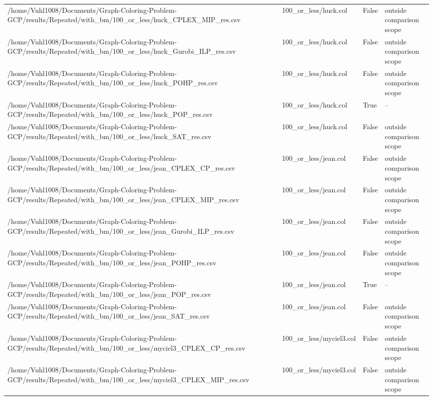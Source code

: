 \begin{table}[htbp]
\begin{tabular}{llll}
/home/Vuhl1008/Documents/Graph-Coloring-Problem-GCP/results/Repeated/with\_bm/100\_or\_less/huck\_CPLEX\_MIP\_res.csv & 100\_or\_less/huck.col & False & outside comparison scope \\
/home/Vuhl1008/Documents/Graph-Coloring-Problem-GCP/results/Repeated/with\_bm/100\_or\_less/huck\_Gurobi\_ILP\_res.csv & 100\_or\_less/huck.col & False & outside comparison scope \\
/home/Vuhl1008/Documents/Graph-Coloring-Problem-GCP/results/Repeated/with\_bm/100\_or\_less/huck\_POHP\_res.csv & 100\_or\_less/huck.col & False & outside comparison scope \\
/home/Vuhl1008/Documents/Graph-Coloring-Problem-GCP/results/Repeated/with\_bm/100\_or\_less/huck\_POP\_res.csv & 100\_or\_less/huck.col & True & -- \\
/home/Vuhl1008/Documents/Graph-Coloring-Problem-GCP/results/Repeated/with\_bm/100\_or\_less/huck\_SAT\_res.csv & 100\_or\_less/huck.col & False & outside comparison scope \\
/home/Vuhl1008/Documents/Graph-Coloring-Problem-GCP/results/Repeated/with\_bm/100\_or\_less/jean\_CPLEX\_CP\_res.csv & 100\_or\_less/jean.col & False & outside comparison scope \\
/home/Vuhl1008/Documents/Graph-Coloring-Problem-GCP/results/Repeated/with\_bm/100\_or\_less/jean\_CPLEX\_MIP\_res.csv & 100\_or\_less/jean.col & False & outside comparison scope \\
/home/Vuhl1008/Documents/Graph-Coloring-Problem-GCP/results/Repeated/with\_bm/100\_or\_less/jean\_Gurobi\_ILP\_res.csv & 100\_or\_less/jean.col & False & outside comparison scope \\
/home/Vuhl1008/Documents/Graph-Coloring-Problem-GCP/results/Repeated/with\_bm/100\_or\_less/jean\_POHP\_res.csv & 100\_or\_less/jean.col & False & outside comparison scope \\
/home/Vuhl1008/Documents/Graph-Coloring-Problem-GCP/results/Repeated/with\_bm/100\_or\_less/jean\_POP\_res.csv & 100\_or\_less/jean.col & True & -- \\
/home/Vuhl1008/Documents/Graph-Coloring-Problem-GCP/results/Repeated/with\_bm/100\_or\_less/jean\_SAT\_res.csv & 100\_or\_less/jean.col & False & outside comparison scope \\
/home/Vuhl1008/Documents/Graph-Coloring-Problem-GCP/results/Repeated/with\_bm/100\_or\_less/myciel3\_CPLEX\_CP\_res.csv & 100\_or\_less/myciel3.col & False & outside comparison scope \\
/home/Vuhl1008/Documents/Graph-Coloring-Problem-GCP/results/Repeated/with\_bm/100\_or\_less/myciel3\_CPLEX\_MIP\_res.csv & 100\_or\_less/myciel3.col & False & outside comparison scope \\

\end{tabular}
\end{table}
